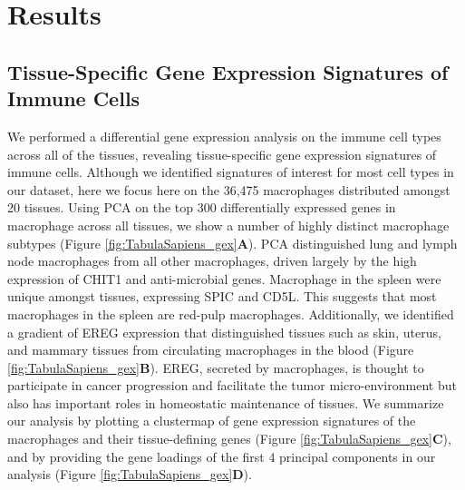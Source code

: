 \section{Results}

\subsection{Tissue-Specific Gene Expression Signatures of Immune Cells}

We performed a differential gene expression analysis on the immune cell types across all of the tissues, revealing tissue-specific gene expression signatures of immune cells. Although we identified signatures of interest for most cell types in our dataset, here we focus here on the 36,475 macrophages distributed amongst 20 tissues. Using PCA on the top 300 differentially expressed genes in macrophage across all tissues, we show a number of highly distinct macrophage subtypes (Figure \ref{fig:TabulaSapiens_gex}\textbf{A}). PCA distinguished lung and lymph node macrophages from all other macrophages, driven largely by the high expression of CHIT1 and anti-microbial genes. Macrophage in the spleen were unique amongst tissues, expressing SPIC and CD5L. This suggests that most macrophages in the spleen are red-pulp macrophages. Additionally, we identified a gradient of EREG expression that distinguished tissues such as skin, uterus, and mammary tissues from circulating macrophages in the blood (Figure \ref{fig:TabulaSapiens_gex}\textbf{B}). EREG, secreted by macrophages, is thought to participate in cancer progression and facilitate the tumor micro-environment but also has important roles in homeostatic maintenance of tissues. We summarize our analysis by plotting a clustermap of gene expression signatures of the macrophages and their tissue-defining genes (Figure \ref{fig:TabulaSapiens_gex}\textbf{C}), and by providing the gene loadings of the first 4 principal components in our analysis (Figure \ref{fig:TabulaSapiens_gex}\textbf{D}). 
